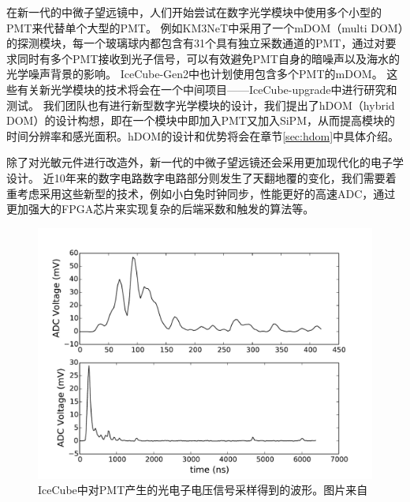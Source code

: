 在新一代的中微子望远镜中，人们开始尝试在数字光学模块中使用多个小型的PMT来代替单个大型的PMT。
例如KM3NeT中采用了一个mDOM（multi DOM）的探测模块，每一个玻璃球内都包含有31个具有独立采数通道的PMT，通过对要求同时有多个PMT接收到光子信号，可以有效避免PMT自身的暗噪声以及海水的光学噪声背景的影响\cite{KM3NeT_mDOM:2014, KM3NeT_mDOM:2015, KM3NeT_mDOM:2022}。
IceCube-Gen2中也计划使用包含多个PMT的mDOM\cite{IceCube-Gen2_mDOM:2021}。
这些有关新光学模块的技术将会在一个中间项目——IceCube-upgrade\cite{IceCube-upgrade:2019}中进行研究和测试\cite{IceCube_upgrade_mDOM:2021, IceCube_D-Egg:2022}。
我们团队也有进行新型数字光学模块的设计，我们提出了hDOM（hybrid DOM）\cite{hDOM:2021}的设计构想，即在一个模块中即加入PMT又加入SiPM，从而提高模块的时间分辨率和感光面积。hDOM的设计和优势将会在章节\ref{sec:hdom}中具体介绍。

除了对光敏元件进行改造外，新一代的中微子望远镜还会采用更加现代化的电子学设计。
近10年来的数字电路数字电路部分则发生了天翻地覆的变化，我们需要着重考虑采用这些新型的技术，例如小白兔时钟同步\cite{white_rabbit:2013}，性能更好的高速ADC\cite{Changda_PandaX_ADC:2021}，通过更加强大的FPGA芯片来实现复杂的后端采数和触发的算法等。

\begin{figure}[htb]
    \centering
    \includegraphics[width=0.8\linewidth]{img/IC_waveform.pdf}
    \caption{IceCube中对PMT产生的光电子电压信号采样得到的波形。图片来自\parencite{IceCube_detector:2016}}
    \label{fig:IC_waveform}
\end{figure}

